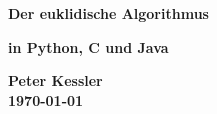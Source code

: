 
\begin{center}
  \vspace*{5cm}
  \noindent\hrulefill
  
  \Huge{\textbf{Der euklidische Algorithmus}}\\
  \noindent\hrulefill

  \vspace*{1\baselineskip}
  \LARGE\textbf{in Python, C und Java}

  \vspace*{2\baselineskip}
  \Large\textbf{Peter Kessler}\\
  \Large\textbf{\today}\\  
  \vfill
\end{center}
